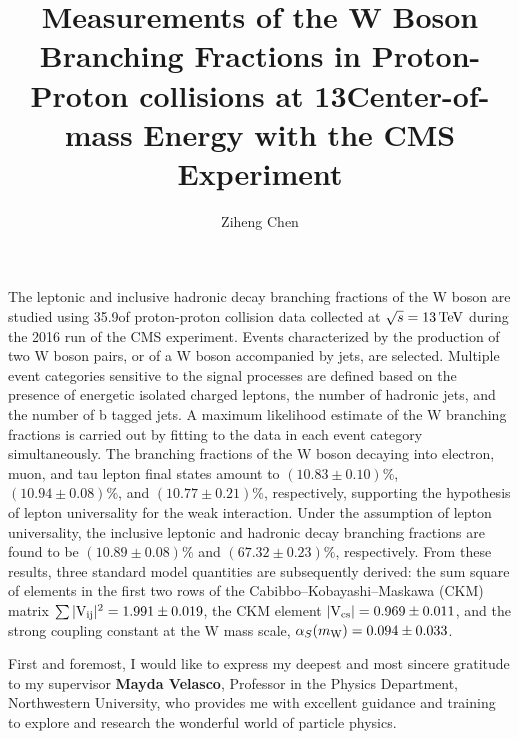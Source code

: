 \documentclass[12pt,reqno]{nuthesis}
\author{Ziheng Chen}
\title{Measurements of the W Boson Branching Fractions in Proton-Proton collisions at 13\TeV Center-of-mass Energy with the CMS Experiment}
\begin{document}
    
    


    \frontmatter

    \maketitle

    \copyrightpage

    \abstract

    The leptonic and inclusive hadronic decay branching fractions of the W boson are studied using 35.9\fbinv of proton-proton collision data collected at $\sqrt{s}=13\,\text{Te\hspace{-.08em}V}$ during the 2016 run of the CMS experiment. Events characterized by the production of two W boson pairs, or of a W boson accompanied by jets, are selected. Multiple event categories sensitive to the signal processes are defined based on the presence of energetic isolated charged leptons, the number of hadronic jets, and the number of b tagged jets.  A maximum likelihood estimate of the W branching fractions is carried out by fitting to the data in each event category simultaneously. The branching fractions of the W boson decaying into electron, muon, and tau lepton final states amount to $(10.83  \pm 0.10)\%$, $(10.94  \pm 0.08)\%$, and $(10.77 \pm 0.21)\%$, respectively, supporting the hypothesis of lepton universality for the weak interaction. Under the assumption of lepton universality, the inclusive leptonic and hadronic decay branching fractions are found to be $(10.89 \pm 0.08)\%$ and $(67.32 \pm 0.23)\%$, respectively. From these results, three standard model quantities are subsequently derived: the sum square of elements in the first two rows of the Cabibbo--Kobayashi--Maskawa (CKM) matrix  $\sum{\ensuremath{\lvert \mathrm{V_{ij}} \rvert}^{2}} = 1.991 \pm 0.019$, the CKM element $\lvert \mathrm{V_{cs}} \rvert = 0.969 \pm 0.011$, and the strong coupling constant at the W mass scale, $\alpha_S(m_\mathrm{W}) = 0.094 \pm 0.033$.


    \acknowledgements

    First and foremost, I would like to express my deepest and most sincere gratitude to my supervisor \textbf{Mayda Velasco}, Professor in the Physics Department, Northwestern University, who provides me with excellent guidance and training to explore and research the wonderful world of particle physics. 
\end{document}
